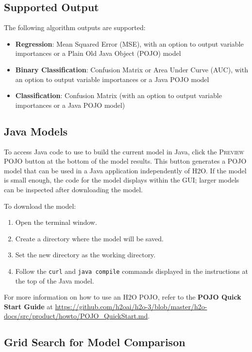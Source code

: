 \subsection{Supported Output}
The following algorithm outputs are supported:
\begin{itemize}
\item {\bf{Regression}}: Mean Squared Error (MSE), with an option to output variable importances or a Plain Old Java Object (POJO) model
\item {\bf{Binary Classification}}: Confusion Matrix or Area Under Curve (AUC), with an option to output variable importances or a Java POJO model
\item {\bf{Classification}}: Confusion Matrix (with an option to output variable importances or a Java POJO model)
\end{itemize}

\subsection{Java Models}

To access Java code to use to build the current model in Java, click the \textsc{Preview POJO} button at the bottom of the model results. This button generates a POJO model that can be used in a Java application independently of H2O. If the model is small enough, the code for the model displays within the GUI; larger models can be inspected after downloading the model.

To download the model:
\begin{enumerate}
\item Open the terminal window.
\item Create a directory where the model will be saved.
\item Set the new directory as the working directory.
\item Follow the \texttt{curl} and \texttt{java compile} commands displayed in the instructions at the top of the Java model.
\end{enumerate}

For more information on how to use an H2O POJO, refer to the \textbf{POJO Quick Start Guide} at {\url{https://github.com/h2oai/h2o-3/blob/master/h2o-docs/src/product/howto/POJO_QuickStart.md}}. 

\subsection{Grid Search for Model Comparison}
\label{ssec:Grid search}

